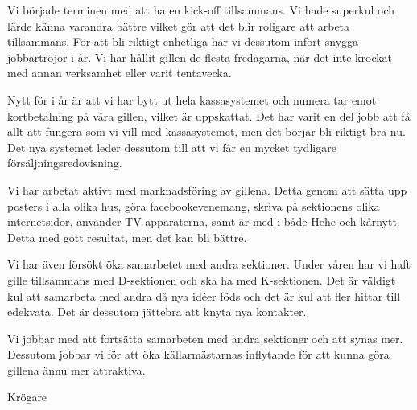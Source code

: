 \documentclass[../_main/handlingar.tex]{subfiles}
\begin{document}

Vi började terminen med att ha en kick-off tillsammans. Vi hade superkul och lärde känna varandra bättre vilket gör att det blir roligare att arbeta tillsammans. För att bli riktigt enhetliga har vi dessutom infört snygga jobbartröjor i år. Vi har hållit gillen de flesta fredagarna, när det inte krockat med annan verksamhet eller varit tentavecka.

Nytt för i år är att vi har bytt ut hela kassasystemet och numera tar emot kortbetalning på våra gillen, vilket är uppskattat. Det har varit en del jobb att få allt att fungera som vi vill med kassasystemet, men det börjar bli riktigt bra nu. Det nya systemet leder dessutom till att vi får en mycket tydligare försäljningsredovisning.

Vi har arbetat aktivt med marknadsföring av gillena. Detta genom att sätta upp posters i alla olika hus, göra facebookevenemang, skriva på sektionens olika internetsidor, använder TV-apparaterna, samt är med i både Hehe och kårnytt. Detta med gott resultat, men det kan bli bättre.

Vi har även försökt öka samarbetet med andra sektioner. Under våren har vi haft gille tillsammans med D-sektionen och ska ha med K-sektionen. Det är väldigt kul att samarbeta med andra då nya idéer föds och det är kul att fler hittar till edekvata. Det är dessutom jättebra att knyta nya kontakter.

Vi jobbar med att fortsätta samarbeten med andra sektioner och att synas mer. Dessutom jobbar vi för att öka källarmästarnas inflytande för att kunna göra gillena ännu mer attraktiva.

\begin{signatures}{1}
    \mvh
    \signature{Malin Lindström}{Krögare}
\end{signatures}
\end{document}
